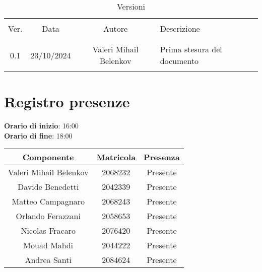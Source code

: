 \documentclass[italian, 12pt]{article}
\begin{document}
\pagestyle{mystyle}


\begin{table}[!h]
	\caption{Versioni}
	\begin{center}
		\begin{tabular}{ c c c p{9cm}}
			\hline \\[-2ex]
			Ver. & Data & Autore & Descrizione \\
			\\[-2ex] \hline \\[-1.5ex]
			0.1 & 23/10/2024 & Valeri Mihail Belenkov& Prima stesura del documento\\
			\\[-1.5ex] \hline
		\end{tabular}
	\end{center}
\end{table}


\tableofcontents
\newpage


\section{Registro presenze}

\textbf{Orario di inizio}: 16:00\\
\textbf{Orario di fine}: 18:00\\


\begin{flushleft}
	\begin{table}[!h]
	\begin{tabular}{ |c|c|c| } 
		\hline
		\textbf{Componente} & \textbf{Matricola} & \textbf{Presenza} \\
  \hline 
		Valeri Mihail Belenkov & 2068232 & Presente \\
		Davide Benedetti 	& 2042339 & Presente \\
		Matteo Campagnaro	& 2068243 & Presente \\
		Orlando Ferazzani 	& 2058653 & Presente \\
		Nicolas Fracaro 	& 2076420 & Presente \\
		Mouad Mahdi		    & 2044222 & Presente \\ 
		Andrea Santi 	    & 2084624 & Presente \\
		\hline
	\end{tabular}
	\end{table}
	\end{flushleft}
\end{document}
